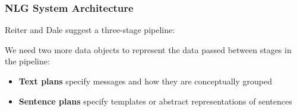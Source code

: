 \begin{frame}
\frametitle{NLG System Architecture}

Reiter and Dale suggest a three-stage pipeline:

\vspace{12pt}

\begin{center}

\end{center}

\vspace{12pt}

We need two more data objects to represent the data passed between
stages in the pipeline:

\begin{itemize}
	\item \textbf{Text plans} specify messages and how they are conceptually grouped
	\item \textbf{Sentence plans} specify templates or abstract representations of sentences
\end{itemize}
\end{frame}

